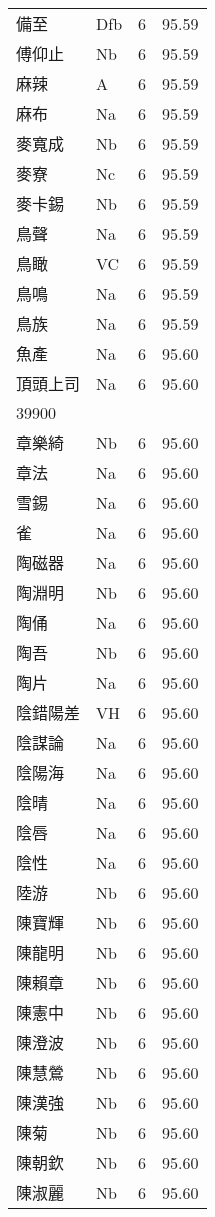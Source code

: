 \documentclass[twocolumn]{book}
\begin{document}
\begin{supertabular}{llrr}
備至 & Dfb & 6 &  95.59\\
傅仰止 & Nb & 6 &  95.59\\
麻辣 & A & 6 &  95.59\\
麻布 & Na & 6 &  95.59\\
麥寬成 & Nb & 6 &  95.59\\
麥寮 & Nc & 6 &  95.59\\
麥卡錫 & Nb & 6 &  95.59\\
鳥聲 & Na & 6 &  95.59\\
鳥瞰 & VC & 6 &  95.59\\
鳥鳴 & Na & 6 &  95.59\\
鳥族 & Na & 6 &  95.59\\
魚產 & Na & 6 &  95.60\\
頂頭上司 & Na & 6 &  95.60\\
39900\\
章樂綺 & Nb & 6 &  95.60\\
章法 & Na & 6 &  95.60\\
雪錫 & Na & 6 &  95.60\\
雀 & Na & 6 &  95.60\\
陶磁器 & Na & 6 &  95.60\\
陶淵明 & Nb & 6 &  95.60\\
陶俑 & Na & 6 &  95.60\\
陶吾 & Nb & 6 &  95.60\\
陶片 & Na & 6 &  95.60\\
陰錯陽差 & VH & 6 &  95.60\\
陰謀論 & Na & 6 &  95.60\\
陰陽海 & Na & 6 &  95.60\\
陰晴 & Na & 6 &  95.60\\
陰唇 & Na & 6 &  95.60\\
陰性 & Na & 6 &  95.60\\
陸游 & Nb & 6 &  95.60\\
陳寶輝 & Nb & 6 &  95.60\\
陳龍明 & Nb & 6 &  95.60\\
陳賴章 & Nb & 6 &  95.60\\
陳憲中 & Nb & 6 &  95.60\\
陳澄波 & Nb & 6 &  95.60\\
陳慧鶯 & Nb & 6 &  95.60\\
陳漢強 & Nb & 6 &  95.60\\
陳菊 & Nb & 6 &  95.60\\
陳朝欽 & Nb & 6 &  95.60\\
陳淑麗 & Nb & 6 &  95.60\\

\end{supertabular}
\end{document}
